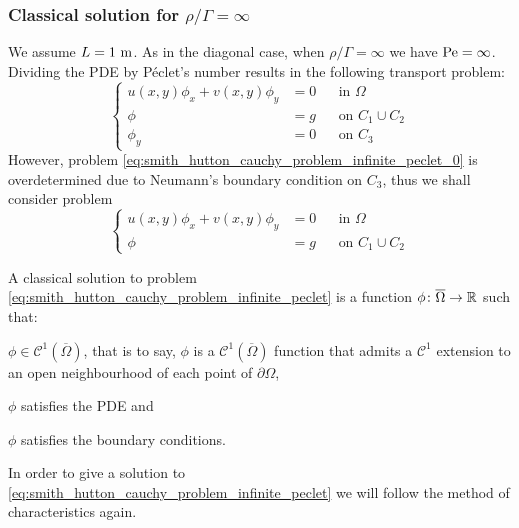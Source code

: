 \subsubsection{Classical solution for \texorpdfstring{$\rho / \Gamma =
\infty$}{infinite rho/Gamma quotient}}

We assume $L = 1 \ \meter$. As in the diagonal case, when $\rho / \Gamma =
\infty$ we have $\peclet = \infty$. Dividing the PDE by Péclet's number results
in the following transport problem:
\begin{equation} \label{eq:smith_hutton_cauchy_problem_infinite_peclet_0} 
	\left\{
	\begin{aligned}
		u(x,y) \phi_x + v(x,y) \phi_y &= 0 	& &\text{in } \Omega \\
		\phi &= g 							& &\text{on } C_1 \cup C_2 \\
		\phi_y &= 0 						& &\text{on } C_3
	\end{aligned}
	\right.
\end{equation}
However, problem \eqref{eq:smith_hutton_cauchy_problem_infinite_peclet_0} is
overdetermined due to Neumann's boundary condition on $C_3$, thus we shall consider problem
\begin{equation} \label{eq:smith_hutton_cauchy_problem_infinite_peclet} 
	\left\{
	\begin{aligned}
		u(x,y) \phi_x + v(x,y) \phi_y &= 0 	& &\text{in } \Omega \\
		\phi &= g 							& &\text{on } C_1 \cup C_2
	\end{aligned}
	\right.
\end{equation}

\begin{definition*}
	A classical solution to problem
	\eqref{eq:smith_hutton_cauchy_problem_infinite_peclet} is a function $\phi
	\colon \overline{\Omega} \rightarrow \real$ such that:
	\begin{enumeratedef}
		\item $\phi \in \mathcal{C}^1(\overline{\Omega})$, that is to say,
		$\phi$ is a $\mathcal{C}^1(\overline{\Omega})$ function that admits a
		$\mathcal{C}^1$ extension to an open neighbourhood of each point of $\partial \Omega$,
		\item $\phi$ satisfies the PDE and
		\item $\phi$ satisfies the boundary conditions.
	\end{enumeratedef}
\end{definition*}

\noindent
In order to give a solution to
\eqref{eq:smith_hutton_cauchy_problem_infinite_peclet} we will follow the method
of characteristics again. 

